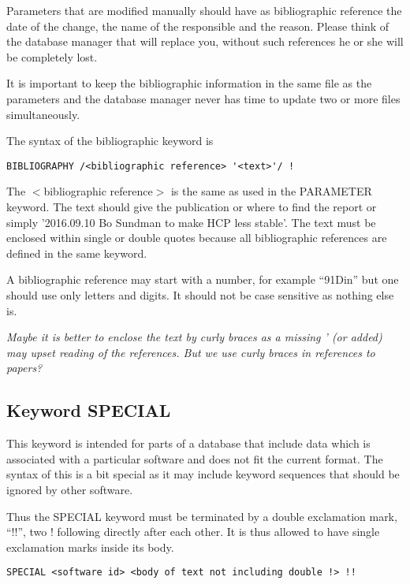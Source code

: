 \documentclass[12pt]{article}
\begin{document}
Parameters that are modified manually should have as bibliographic
reference the date of the change, the name of the responsible and the
reason.  Please think of the database manager that will replace you,
without such references he or she will be completely lost.

It is important to keep the bibliographic information in the same file
as the parameters and the database manager never has time to update
two or more files simultaneously.

The syntax of the bibliographic keyword is

\begin{verbatim}
BIBLIOGRAPHY /<bibliographic reference> '<text>'/ !
\end{verbatim}

The $<$bibliographic reference$>$ is the same as used in the PARAMETER
keyword.  The text should give the publication or where to find the
report or simply '2016.09.10 Bo Sundman to make HCP less stable'.  The
text must be enclosed within single or double quotes because all
bibliographic references are defined in the same keyword.

A bibliographic reference may start with a number, for example
``91Din'' but one should use only letters and digits.  It should not
be case sensitive as nothing else is.

{\em Maybe it is better to enclose the text by curly braces {} as
  a missing ' (or added) may upset reading of the references.  But we
  use curly braces in references to papers?}

\subsection{Keyword SPECIAL}

This keyword is intended for parts of a database that include data
which is associated with a particular software and does not fit the
current format.  The syntax of this is a bit special as it may include
keyword sequences that should be ignored by other software.

Thus the SPECIAL keyword must be terminated by a double exclamation
mark, ``!!'', two ! following directly after each other.  It is thus
allowed to have single exclamation marks inside its body.

\begin{verbatim} 
SPECIAL <software id> <body of text not including double !> !!
\end{verbatim} 
\end{document}
